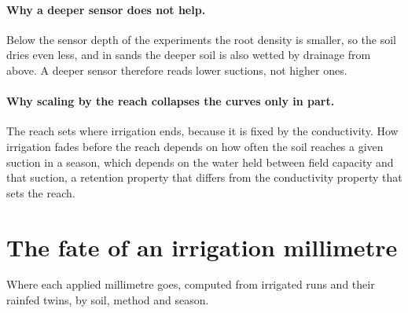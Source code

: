 \paragraph{Why a deeper sensor does not help.} Below the sensor depth of the experiments the root density is smaller, so the soil dries even less, and in sands the deeper soil is also wetted by drainage from above. A deeper sensor therefore reads lower suctions, not higher ones.

\paragraph{Why scaling by the reach collapses the curves only in part.} The reach sets where irrigation ends, because it is fixed by the conductivity. How irrigation fades before the reach depends on how often the soil reaches a given suction in a season, which depends on the water held between field capacity and that suction, a retention property that differs from the conductivity property that sets the reach.

\section{The fate of an irrigation millimetre}
Where each applied millimetre goes, computed from irrigated runs and their rainfed twins, by soil, method and season.

